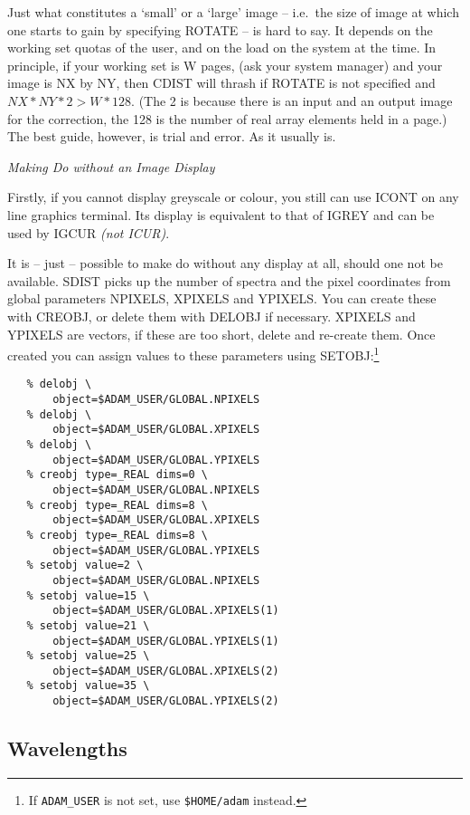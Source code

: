 Just what constitutes a `small' or a `large' image -- i.e.\ the size
of image at which one starts to gain by specifying ROTATE -- is hard to
say.  It depends on the working set quotas of the user, and on the load
on the system at the time.  In principle, if your working set is W pages, 
(ask your system manager) and your image is NX by NY, then CDIST will
thrash if ROTATE is not specified and $NX*NY*2 > W*128$.
(The 2 is because there is an input
and an output image for the correction, the 128 is the number of real
array elements held in a page.)  The best guide, however, is trial and
error.  As it usually is.


\goodbreak
\vspace{12pt}
{\it Making Do without an Image Display}

Firstly, if you cannot display greyscale or colour, you still can use ICONT
on any line graphics terminal. Its display is equivalent to that of IGREY
and can be used by IGCUR {\it (not ICUR)}.

It is -- just -- possible to make do without any display at all,
should one not be
available. SDIST picks up the number of spectra and the pixel coordinates from
global parameters NPIXELS, XPIXELS and YPIXELS. You can create these with
CREOBJ, or delete them with DELOBJ if necessary. XPIXELS and YPIXELS are
vectors, if these are too short, delete and re-create them. Once created you
can assign values to these parameters using SETOBJ:\footnote{
   If {\tt ADAM\_USER} is not set, use {\tt \$HOME/adam} instead.}

\begin{verbatim}
   % delobj \
       object=$ADAM_USER/GLOBAL.NPIXELS
   % delobj \
       object=$ADAM_USER/GLOBAL.XPIXELS
   % delobj \
       object=$ADAM_USER/GLOBAL.YPIXELS
   % creobj type=_REAL dims=0 \
       object=$ADAM_USER/GLOBAL.NPIXELS
   % creobj type=_REAL dims=8 \
       object=$ADAM_USER/GLOBAL.XPIXELS
   % creobj type=_REAL dims=8 \
       object=$ADAM_USER/GLOBAL.YPIXELS
   % setobj value=2 \
       object=$ADAM_USER/GLOBAL.NPIXELS
   % setobj value=15 \
       object=$ADAM_USER/GLOBAL.XPIXELS(1)
   % setobj value=21 \
       object=$ADAM_USER/GLOBAL.YPIXELS(1)
   % setobj value=25 \
       object=$ADAM_USER/GLOBAL.XPIXELS(2)
   % setobj value=35 \
       object=$ADAM_USER/GLOBAL.YPIXELS(2)
\end{verbatim}


\subsection{Wavelengths}

